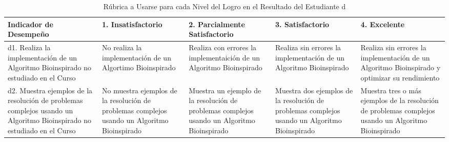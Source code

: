 \begin{landscape}
\begin{table}[h]
\centering
\begin{tabular}{C{5cm}|C{4cm}|C{4cm}|C{4cm}|C{4cm}}
\hline
\textbf{Indicador de Desempeño} & 
\textbf{1. Insatisfactorio} & 
\textbf{2. Parcialmente Satisfactorio} & 
\textbf{3. Satisfactorio} & 
\textbf{4. Excelente} 
\\ \hline
d1. Realiza la implementación de un Algoritmo Bioinspirado no estudiado en el Curso &
No realiza la implementación de un Algortimo Bioinspirado &
Realiza con errores la implementaición de un Algoritmo Bioinspirado &
Realiza sin errores la implementación de un Algoritmo Bioinspirado &
Realiza sin errores la implementación de un Algoritmo Bioinspirado y optimizar su rendimiento
\\ \hline
d2. Muestra ejemplos de la resolución de problemas complejos usando un Algoritmo Bioinspirado no estudiado en el Curso &
No muestra ejemplos de la resolución de problemas complejos usando un Algoritmo Bioinspirado &
Muestra un ejemplo de la resolución de problemas complejos usando un Algoritmo Bioinspirado &
Muestra dos ejemplos de la resolución de problemas complejos usando un Algoritmo Bioinspirado &
Muestra tres o más ejemplos de la resolución de problemas complejos usando un Algoritmo Bioinspirado
\\ \hline
\end{tabular}
\caption{Rúbrica a Usarse para cada Nivel del Logro en el Resultado del Estudiante \lbrack d\rbrack}
\label{tab:nivel_rubrica_d} 
\end{table}

\newpage


\end{landscape}
